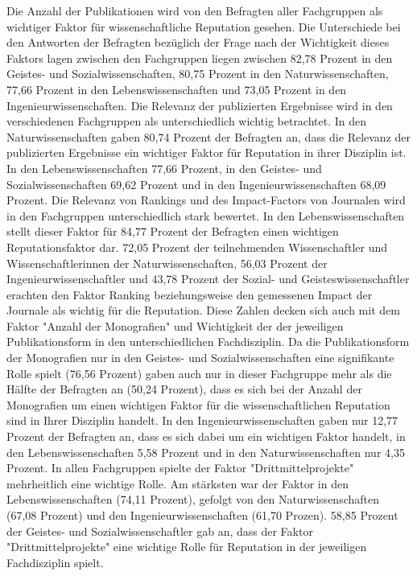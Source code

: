 Die Anzahl der Publikationen wird von den Befragten aller Fachgruppen als wichtiger Faktor für wissenschaftliche Reputation gesehen. Die Unterschiede bei den Antworten der Befragten bezüglich der Frage nach der Wichtigkeit dieses Faktors lagen zwischen den Fachgruppen liegen zwischen 82,78 Prozent in den Geistes- und Sozialwissenschaften, 80,75 Prozent in den Naturwissenschaften, 77,66 Prozent in den Lebenswissenschaften und 73,05 Prozent in den Ingenieurwissenschaften. Die Relevanz der publizierten Ergebnisse wird in den verschiedenen Fachgruppen als unterschiedlich wichtig betrachtet. In den Naturwissenschaften gaben 80,74 Prozent der Befragten an, dass die Relevanz der publizierten Ergebnisse ein wichtiger Faktor für Reputation in ihrer Disziplin ist. In den Lebenswissenschaften 77,66 Prozent, in den Geistes- und Sozialwissenschaften 69,62 Prozent und in den Ingenieurwissenschaften 68,09 Prozent. Die Relevanz von Rankings und des Impact-Factors von Journalen wird in den Fachgruppen unterschiedlich stark bewertet. In den Lebenswissenschaften stellt dieser Faktor für 84,77 Prozent der Befragten einen wichtigen Reputationsfaktor dar. 72,05 Prozent der teilnehmenden Wissenschaftler und Wissenschaftlerinnen der Naturwissenschaften, 56,03 Prozent der Ingenieurwissenschaftler und 43,78 Prozent der Sozial- und Geisteswissenschaftler erachten den Faktor Ranking beziehungsweise den gemessenen Impact der Journale als wichtig für die Reputation. Diese Zahlen decken sich auch mit dem Faktor "Anzahl der Monografien" und Wichtigkeit der der jeweiligen Publikationsform in den unterschiedlichen Fachdisziplin. Da die Publikationsform der Monografien nur in den Geistes- und Sozialwissenschaften eine signifikante Rolle spielt (76,56 Prozent) gaben auch nur in dieser Fachgruppe mehr als die Hälfte der Befragten an (50,24 Prozent), dass es sich bei der Anzahl der Monografien um einen wichtigen Faktor für die wissenschaftlichen Reputation sind in Ihrer Disziplin handelt. In den Ingenieurwissenschaften gaben nur 12,77 Prozent der Befragten an, dass es sich dabei um ein wichtigen Faktor handelt, in den Lebenswissenschaften 5,58 Prozent und in den Naturwissenschaften nur 4,35 Prozent. In allen Fachgruppen spielte der Faktor "Drittmittelprojekte" mehrheitlich eine wichtige Rolle. Am stärksten war der Faktor in den Lebenswissenschaften (74,11 Prozent), gefolgt von den Naturwissenschaften (67,08 Prozent) und den Ingenieurwissenschaften (61,70 Prozen). 58,85 Prozent der Geistes- und Sozialwissenschaftler gab an, dass der Faktor "Drittmittelprojekte" eine wichtige Rolle für Reputation in der jeweiligen Fachdisziplin spielt.

